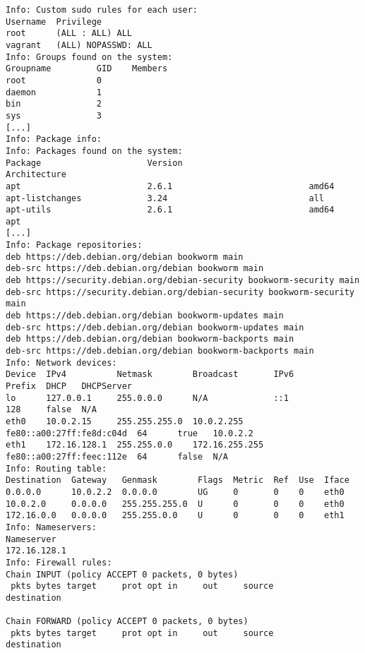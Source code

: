 \begin{longlisting}
\begin{verbatim}
Info: Custom sudo rules for each user:
Username  Privilege
root      (ALL : ALL) ALL
vagrant   (ALL) NOPASSWD: ALL
Info: Groups found on the system:
Groupname         GID    Members
root              0
daemon            1
bin               2
sys               3
[...]
Info: Package info:
Info: Packages found on the system:
Package                     Version                         Architecture
apt                         2.6.1                           amd64
apt-listchanges             3.24                            all
apt-utils                   2.6.1                           amd64         apt
[...]
Info: Package repositories:
deb https://deb.debian.org/debian bookworm main
deb-src https://deb.debian.org/debian bookworm main
deb https://security.debian.org/debian-security bookworm-security main
deb-src https://security.debian.org/debian-security bookworm-security main
deb https://deb.debian.org/debian bookworm-updates main
deb-src https://deb.debian.org/debian bookworm-updates main
deb https://deb.debian.org/debian bookworm-backports main
deb-src https://deb.debian.org/debian bookworm-backports main
Info: Network devices:
Device  IPv4          Netmask        Broadcast       IPv6                      Prefix  DHCP   DHCPServer
lo      127.0.0.1     255.0.0.0      N/A             ::1                       128     false  N/A
eth0    10.0.2.15     255.255.255.0  10.0.2.255      fe80::a00:27ff:fe8d:c04d  64      true   10.0.2.2
eth1    172.16.128.1  255.255.0.0    172.16.255.255  fe80::a00:27ff:feec:112e  64      false  N/A
Info: Routing table:
Destination  Gateway   Genmask        Flags  Metric  Ref  Use  Iface
0.0.0.0      10.0.2.2  0.0.0.0        UG     0       0    0    eth0
10.0.2.0     0.0.0.0   255.255.255.0  U      0       0    0    eth0
172.16.0.0   0.0.0.0   255.255.0.0    U      0       0    0    eth1
Info: Nameservers:
Nameserver
172.16.128.1
Info: Firewall rules:
Chain INPUT (policy ACCEPT 0 packets, 0 bytes)
 pkts bytes target     prot opt in     out     source               destination

Chain FORWARD (policy ACCEPT 0 packets, 0 bytes)
 pkts bytes target     prot opt in     out     source               destination


\end{verbatim}
\end{longlisting}
